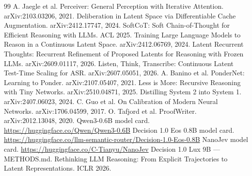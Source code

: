 \documentclass[11pt,a4paper]{article}
\begin{document}
\begin{thebibliography}{99}
\small
{} A. Jaegle et al. Perceiver: General Perception with Iterative Attention. arXiv:2103.03206, 2021.
 Deliberation in Latent Space via Differentiable Cache Augmentation. arXiv:2412.17747, 2024.
 SoftCoT: Soft Chain-of-Thought for Efficient Reasoning with LLMs. ACL 2025.
 Training Large Language Models to Reason in a Continuous Latent Space. arXiv:2412.06769, 2024.
 Latent Recurrent Thoughts: Recurrent Refinement of Proposed Latents for Reasoning with Frozen LLMs. arXiv:2609.01117, 2026.
 Listen, Think, Transcribe: Continuous Latent Test-Time Scaling for ASR. arXiv:2607.05051, 2026.
 A. Banino et al. PonderNet: Learning to Ponder. arXiv:2107.05407, 2021.
 Less is More: Recursive Reasoning with Tiny Networks. arXiv:2510.04871, 2025.
 Distilling System 2 into System 1. arXiv:2407.06023, 2024.
 C. Guo et al. On Calibration of Modern Neural Networks. arXiv:1706.04599, 2017.
 O. Tafjord et al. ProofWriter. arXiv:2012.13048, 2020.
 Qwen3-0.6B model card. \url{https://huggingface.co/Qwen/Qwen3-0.6B}
 Decision 1.0 Eos 0.8B model card. \url{https://huggingface.co/llm-semantic-router/Decision-1.0-Eos-0.8B}
 NanoJev model card. \url{https://huggingface.co/C-Tianyu/NanoJev}
 Decision 1.0 Lux 9B --- METHODS.md.
 Rethinking LLM Reasoning: From Explicit Trajectories to Latent Representations. ICLR 2026.
\end{thebibliography}
\end{document}
